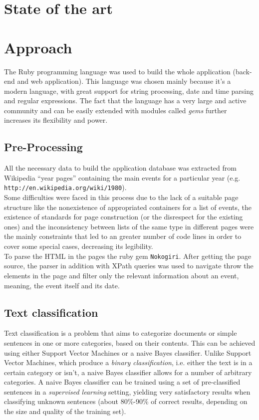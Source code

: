 \documentclass{llncs}
\begin{document}
\section{State of the art}

\section{Approach}
\label{sec:approach}

The Ruby programming language was used to build the whole application (back-end and web application). This language was chosen mainly because it's a modern language, with great support for string processing, date and time parsing and regular expressions. The fact that the language has a very large and active community and can be easily extended with modules called \textit{gems} further increases its flexibility and power.

\subsection{Pre-Processing}

All the necessary data to build the application database was extracted from Wikipedia ``year pages'' containing the main events for a particular year (e.g. \verb!http://en.wikipedia.org/wiki/1980!).\\

Some difficulties were faced in this process due to the lack of a suitable page structure like the nonexistence of appropriated containers for a list of events, the existence of standards for page construction (or the disrespect for the existing ones) and the inconsistency between lists of the same type in different pages were the mainly constraints that led to an greater number of code lines in order to cover some special cases, decreasing its legibility.\\

To parse the HTML in the pages the ruby gem \verb!Nokogiri!. After getting the page source, the parser in addition with XPath queries was used to navigate throw the elements in the page and filter only the relevant information about an event, meaning, the event itself and its date.


\subsection{Text classification}
\label{subsec:approach:text-classification}

Text classification is a problem that aims to categorize documents or simple sentences in one or more categories, based on their contents. This can be achieved using either Support Vector Machines or a naive Bayes classifier. Unlike Support Vector Machines, which produce a \textit{binary classification}, i.e. either the text is in a certain category or isn't, a naive Bayes classifier allows for a number of arbitrary categories. A naive Bayes classifier can be trained using a set of pre-classified sentences in a \textit{supervised learning} setting, yielding very satisfactory results when classifying unknown sentences (about 80\%-90\% of correct results, depending on the size and quality of the training set).\cite{russel}
\end{document}
